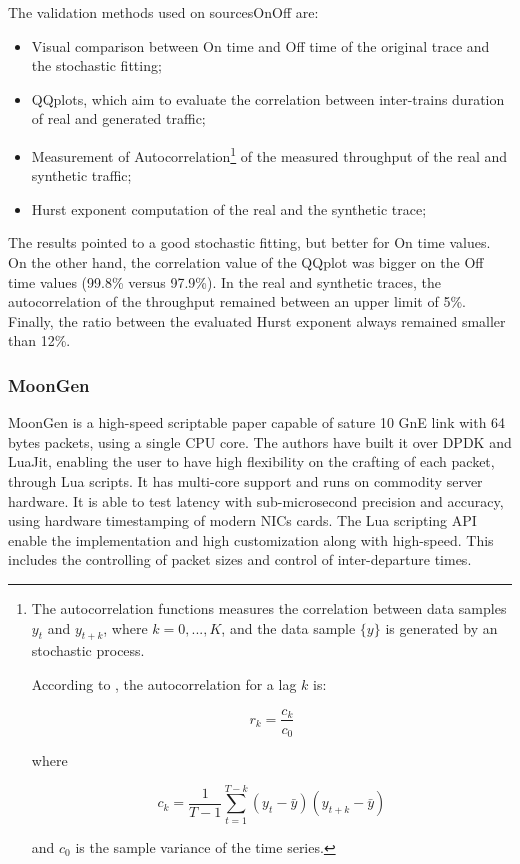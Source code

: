 The validation methods used on sourcesOnOff are: 
\begin{itemize}
\item Visual comparison between On time and Off time of the original trace and the stochastic fitting;
\item QQplots, which aim to evaluate the correlation between inter-trains duration of real and generated traffic;
\item Measurement of Autocorrelation\footnote{
The autocorrelation functions measures the correlation between data samples $y_{t}$ and $y_{t + k}$, where $k =0, ..., K$, and the data sample $\{y\}$  is generated by an stochastic process.

According to \cite{book-time-series-analysis}, the autocorrelation for a lag $k$ is:

\begin{equation}
r_{k} = \frac{c_{k}}{c_{0}}
\end{equation}

where 

\begin{equation}
c_{k} = \frac{1}{T - 1}\sum_{t = 1}^{T - k} (y_{t} - \bar{y})(y_{t+k} - \bar{y})
\end{equation}

and $c_{0}$ is the sample variance of the time series. 
} of the measured throughput of the real and synthetic traffic;
\item Hurst exponent computation of the real and the synthetic trace;
\end{itemize}

The results pointed to a good stochastic fitting, but better for On time values. On the other hand, the correlation value of the QQplot was bigger on the Off time values (99.8\% versus 97.9\%). In the real and synthetic traces, the autocorrelation of the throughput remained between an upper limit of 5\%. Finally, the ratio between the evaluated Hurst exponent always remained smaller than 12\%.


\subsubsection{MoonGen}

MoonGen\cite{moongen-paper} is a high-speed scriptable paper capable of sature  10 GnE link with 64 bytes packets, using a single CPU core. The authors have built it over DPDK and LuaJit, enabling the user to have high flexibility on the crafting of each packet, through Lua scripts. It has multi-core support and runs on commodity server hardware. It is able to test latency with sub-microsecond precision and accuracy, using hardware timestamping of modern NICs cards. The Lua scripting API enable the implementation and high customization along with high-speed. This includes the controlling of packet sizes and control of inter-departure times.

